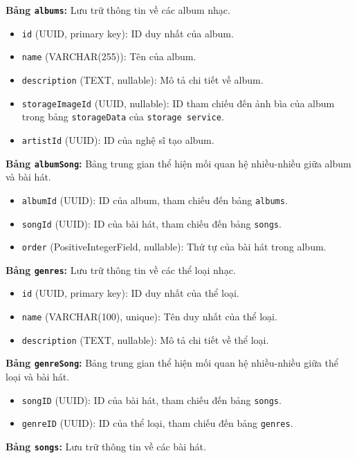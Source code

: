 \textbf{Bảng \texttt{albums}:} Lưu trữ thông tin về các album nhạc.
\begin{itemize}
    \item \texttt{id} (UUID, primary key): ID duy nhất của album.
    \item \texttt{name} (VARCHAR(255)): Tên của album.
    \item \texttt{description} (TEXT, nullable): Mô tả chi tiết về album.
    \item \texttt{storageImageId} (UUID, nullable): ID tham chiếu đến ảnh bìa của album trong bảng \texttt{storageData} của \texttt{storage service}.
    \item \texttt{artistId} (UUID): ID của nghệ sĩ tạo album.
\end{itemize}
\textbf{Bảng \texttt{albumSong}:} Bảng trung gian thể hiện mối quan hệ nhiều-nhiều giữa album và bài hát.
\begin{itemize}
    \item \texttt{albumId} (UUID): ID của album, tham chiếu đến bảng \texttt{albums}.
    \item \texttt{songId} (UUID): ID của bài hát, tham chiếu đến bảng \texttt{songs}.
    \item \texttt{order} (PositiveIntegerField, nullable): Thứ tự của bài hát trong album.
\end{itemize}
\textbf{Bảng \texttt{genres}:} Lưu trữ thông tin về các thể loại nhạc.
\begin{itemize}
    \item \texttt{id} (UUID, primary key): ID duy nhất của thể loại.
    \item \texttt{name} (VARCHAR(100), unique): Tên duy nhất của thể loại.
    \item \texttt{description} (TEXT, nullable): Mô tả chi tiết về thể loại.
\end{itemize}
\textbf{Bảng \texttt{genreSong}:} Bảng trung gian thể hiện mối quan hệ nhiều-nhiều giữa thể loại và bài hát.
\begin{itemize}
    \item \texttt{songID} (UUID): ID của bài hát, tham chiếu đến bảng \texttt{songs}.
    \item \texttt{genreID} (UUID): ID của thể loại, tham chiếu đến bảng \texttt{genres}.
\end{itemize}
\textbf{Bảng \texttt{songs}:} Lưu trữ thông tin về các bài hát.
